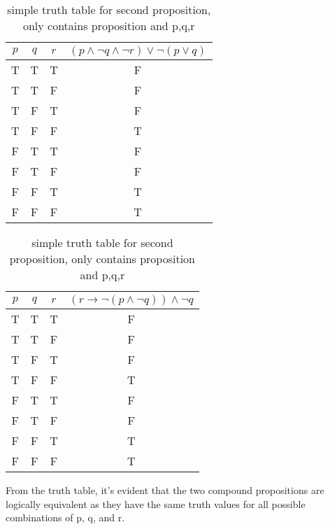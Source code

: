 \documentclass[12pt,a4paper]{article}
\begin{document}
\begin{table}[h]
    \centering
    \begin{minipage}{0.45\textwidth}
        \centering
        \begin{tabular}{|c|c|c|c|}
            \hline
            \( p \) & \( q \) & \( r \) & \( (p \land \neg q \land \neg r) \lor \neg (p \lor q) \) \\
            \hline
            T & T & T & F \\
            T & T & F & F \\
            T & F & T & F \\
            T & F & F & T \\
            F & T & T & F \\
            F & T & F & F \\
            F & F & T & T \\
            F & F & F & T \\
            \hline
        \end{tabular}
        \caption{simple truth table for first proposition, only contains proposition and p,q,r}
    \end{minipage}
    \hfill
    \begin{minipage}{0.45\textwidth}
        \centering
        \begin{tabular}{|c|c|c|c|}
            \hline
            \( p \) & \( q \) & \( r \) & \( (r \rightarrow \neg(p \land \neg q)) \land \neg q \) \\
            \hline
            T & T & T & F \\
            T & T & F & F \\
            T & F & T & F \\
            T & F & F & T \\
            F & T & T & F \\
            F & T & F & F \\
            F & F & T & T \\
            F & F & F & T \\
            \hline
        \end{tabular}
        \caption{simple truth table for second proposition, only contains proposition and p,q,r}
    \end{minipage}
\end{table}

From the truth table, it's evident that the two compound propositions are logically equivalent as they have the same truth values for all possible combinations of p, q, and r.
\end{document}
